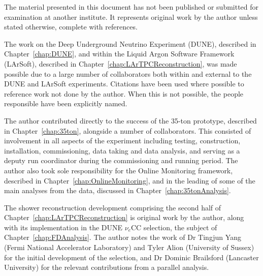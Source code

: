 
\begin{declaration}

  The material presented in this document has not been published or submitted for examination at another institute.  It represents original work by the author unless stated otherwise, complete with references.

  The work on the Deep Underground Neutrino Experiment (DUNE), described in Chapter~\ref{chap:DUNE}, and within the Liquid Argon Software Framework (LArSoft), described in Chapter~\ref{chap:LArTPCReconstruction}, was made possible due to a large number of collaborators both within and external to the DUNE and LArSoft experiments.  Citations have been used where possible to reference work not done by the author.  When this is not possible, the people responsible have been explicitly named.

  The author contributed directly to the success of the 35-ton prototype, described in Chapter~\ref{chap:35ton}, alongside a number of collaborators.  This consisted of involvement in all aspects of the experiment including testing, construction, installation, commissioning, data taking and data analysis, and serving as a deputy run coordinator during the commissioning and running period.  The author also took sole responsibility for the Online Monitoring framework, described in Chapter~\ref{chap:OnlineMonitoring}, and in the leading of some of the main analyses from the data, discussed in Chapter~\ref{chap:35tonAnalysis}.

  The shower reconstruction development comprising the second half of Chapter~\ref{chap:LArTPCReconstruction} is original work by the author, along with its implementation in the DUNE $\nu_e$CC selection, the subject of Chapter~\ref{chap:FDAnalysis}.  The author notes the work of Dr Tingjun Yang (Fermi National Accelerator Laboratory) and Tyler Alion (University of Sussex) for the initial development of the selection, and Dr Dominic Brailsford (Lancaster University) for the relevant contributions from a parallel analysis.



\end{declaration}

